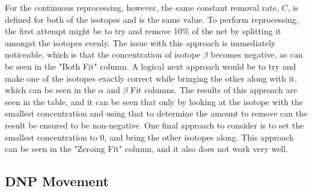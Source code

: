 For the continuous reprocessing, however, the same constant removal rate, $C$, is defined for both of the isotopes and is the same value. To perform reprocessing, the first attempt might be to try and remove 10\% of the net by splitting it amongst the isotopes evenly. The issue with this approach is immediately noticeable, which is that the concentration of isotope $\beta$ becomes negative, as can be seen in the "Both Fit" column. A logical next approach would be to try and make one of the isotopes exactly correct while bringing the other along with it, which can be seen in the $\alpha$ and $\beta$ Fit columns. The results of this approach are seen in the table, and it can be seen that only by looking at the isotope with the smallest concentration and using that to determine the amount to remove can the result be ensured to be non-negative. One final approach to consider is to set the smallest concentration to 0, and bring the other isotopes along. This approach can be seen in the "Zeroing Fit" column, and it also does not work very well.



\subsection{DNP Movement}

